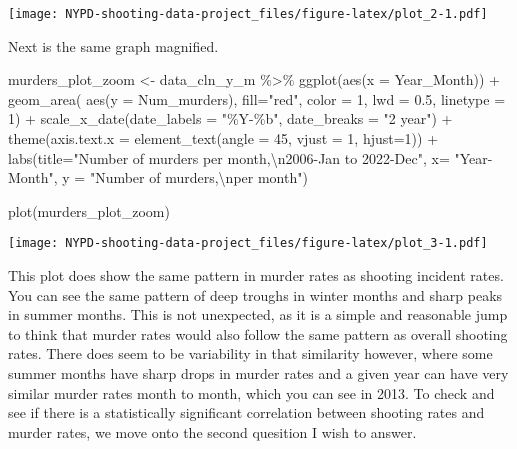 \documentclass[
]{article}
\newenvironment{Shaded}{\begin{snugshade}}{\end{snugshade}}
\newcommand{\AttributeTok}[1]{\textcolor[rgb]{0.77,0.63,0.00}{#1}}
\newcommand{\DecValTok}[1]{\textcolor[rgb]{0.00,0.00,0.81}{#1}}
\newcommand{\FloatTok}[1]{\textcolor[rgb]{0.00,0.00,0.81}{#1}}
\newcommand{\FunctionTok}[1]{\textcolor[rgb]{0.00,0.00,0.00}{#1}}
\newcommand{\NormalTok}[1]{#1}
\newcommand{\OtherTok}[1]{\textcolor[rgb]{0.56,0.35,0.01}{#1}}
\newcommand{\SpecialCharTok}[1]{\textcolor[rgb]{0.00,0.00,0.00}{#1}}
\newcommand{\StringTok}[1]{\textcolor[rgb]{0.31,0.60,0.02}{#1}}
\begin{document}
\texttt{[image: NYPD-shooting-data-project\_files/figure-latex/plot\_2-1.pdf]}

Next is the same graph magnified.

\begin{Shaded}
\begin{Highlighting}[]
\NormalTok{murders\_plot\_zoom }\OtherTok{\textless{}{-}}\NormalTok{ data\_cln\_y\_m }\SpecialCharTok{\%\textgreater{}\%} \FunctionTok{ggplot}\NormalTok{(}\FunctionTok{aes}\NormalTok{(}\AttributeTok{x =}\NormalTok{ Year\_Month)) }\SpecialCharTok{+} \FunctionTok{geom\_area}\NormalTok{( }\FunctionTok{aes}\NormalTok{(}\AttributeTok{y =}\NormalTok{ Num\_murders), }\AttributeTok{fill=}\StringTok{"red"}\NormalTok{, }\AttributeTok{color =} \DecValTok{1}\NormalTok{, }\AttributeTok{lwd =} \FloatTok{0.5}\NormalTok{, }\AttributeTok{linetype =} \DecValTok{1}\NormalTok{) }\SpecialCharTok{+} \FunctionTok{scale\_x\_date}\NormalTok{(}\AttributeTok{date\_labels =} \StringTok{"\%Y{-}\%b"}\NormalTok{, }\AttributeTok{date\_breaks =} \StringTok{"2 year"}\NormalTok{) }\SpecialCharTok{+} \FunctionTok{theme}\NormalTok{(}\AttributeTok{axis.text.x =} \FunctionTok{element\_text}\NormalTok{(}\AttributeTok{angle =} \DecValTok{45}\NormalTok{, }\AttributeTok{vjust =} \DecValTok{1}\NormalTok{, }\AttributeTok{hjust=}\DecValTok{1}\NormalTok{)) }\SpecialCharTok{+} \FunctionTok{labs}\NormalTok{(}\AttributeTok{title=}\StringTok{"Number of murders per month,}\SpecialCharTok{\textbackslash{}n}\StringTok{2006{-}Jan to 2022{-}Dec"}\NormalTok{, }\AttributeTok{x=} \StringTok{"Year{-}Month"}\NormalTok{, }\AttributeTok{y =} \StringTok{"Number of murders,}\SpecialCharTok{\textbackslash{}n}\StringTok{per month"}\NormalTok{)}

\FunctionTok{plot}\NormalTok{(murders\_plot\_zoom)}
\end{Highlighting}
\end{Shaded}

\texttt{[image: NYPD-shooting-data-project\_files/figure-latex/plot\_3-1.pdf]}

This plot does show the same pattern in murder rates as shooting
incident rates. You can see the same pattern of deep troughs in winter
months and sharp peaks in summer months. This is not unexpected, as it
is a simple and reasonable jump to think that murder rates would also
follow the same pattern as overall shooting rates. There does seem to be
variability in that similarity however, where some summer months have
sharp drops in murder rates and a given year can have very similar
murder rates month to month, which you can see in 2013. To check and see
if there is a statistically significant correlation between shooting
rates and murder rates, we move onto the second quesition I wish to
answer.
\end{document}
